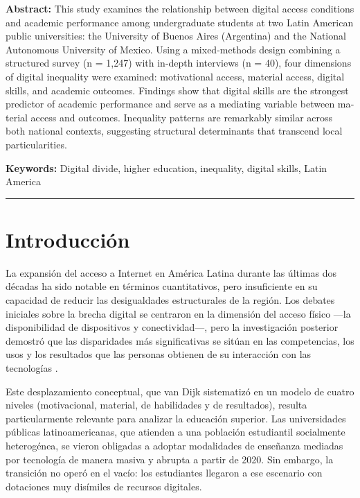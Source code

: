 \documentclass{article}
\begin{document}
\begin{tcolorbox}[colback=brown!8!white,colframe=brown!8!white,boxrule=0pt,arc=2pt,left=4pt,right=4pt,top=3pt,bottom=3pt,before skip=4pt,after skip=4pt]
\begin{otherlanguage}{english}
\sffamily\small \textbf{Abstract:} This study examines the relationship between digital access conditions and academic performance among undergraduate students at two Latin American public universities: the University of Buenos Aires (Argentina) and the National Autonomous University of Mexico. Using a mixed-methods design combining a structured survey (n = 1,247) with in-depth interviews (n = 40), four dimensions of digital inequality were examined: motivational access, material access, digital skills, and academic outcomes. Findings show that digital skills are the strongest predictor of academic performance and serve as a mediating variable between material access and outcomes. Inequality patterns are remarkably similar across both national contexts, suggesting structural determinants that transcend local particularities.
\par\smallskip\noindent\textbf{Keywords:} Digital divide, higher education, inequality, digital skills, Latin America
\end{otherlanguage}
\end{tcolorbox}

\bigskip
\noindent\rule{\linewidth}{0.4pt}
\bigskip

\section{Introducción}
La expansión del acceso a Internet en América Latina durante las últimas dos décadas ha sido notable en términos cuantitativos, pero insuficiente en su capacidad de reducir las desigualdades estructurales de la región. Los debates iniciales sobre la brecha digital se centraron en la dimensión del acceso físico —la disponibilidad de dispositivos y conectividad—, pero la investigación posterior demostró que las disparidades más significativas se sitúan en las competencias, los usos y los resultados que las personas obtienen de su interacción con las tecnologías \autocite{2565-HARGITTAI2002,2562-WARSCHAUER2004}.

Este desplazamiento conceptual, que van Dijk \autocite*{2563-VANDIJK2020} sistematizó en un modelo de cuatro niveles (motivacional, material, de habilidades y de resultados), resulta particularmente relevante para analizar la educación superior. Las universidades públicas latinoamericanas, que atienden a una población estudiantil socialmente heterogénea, se vieron obligadas a adoptar modalidades de enseñanza mediadas por tecnología de manera masiva y abrupta a partir de 2020. Sin embargo, la transición no operó en el vacío: los estudiantes llegaron a ese escenario con dotaciones muy disímiles de recursos digitales.
\end{document}
